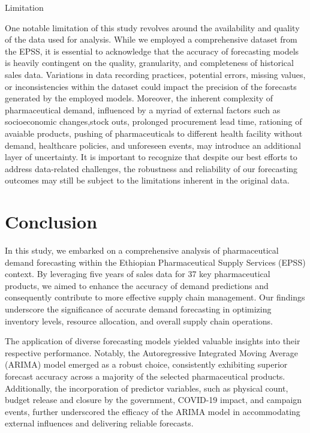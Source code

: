 \documentclass[
  authoryear,
  preprint,
  3p]{elsarticle}
\begin{document}
Limitation

One notable limitation of this study revolves around the availability
and quality of the data used for analysis. While we employed a
comprehensive dataset from the EPSS, it is essential to acknowledge that
the accuracy of forecasting models is heavily contingent on the quality,
granularity, and completeness of historical sales data. Variations in
data recording practices, potential errors, missing values, or
inconsistencies within the dataset could impact the precision of the
forecasts generated by the employed models. Moreover, the inherent
complexity of pharmaceutical demand, influenced by a myriad of external
factors such as socioeconomic changes,stock outs, prolonged procurement
lead time, rationing of avaiable products, pushing of pharmaceuticals to
different health facility without demand, healthcare policies, and
unforeseen events, may introduce an additional layer of uncertainty. It
is important to recognize that despite our best efforts to address
data-related challenges, the robustness and reliability of our
forecasting outcomes may still be subject to the limitations inherent in
the original data.

\hypertarget{sec-conclusion}{%
\section{Conclusion}\label{sec-conclusion}}

In this study, we embarked on a comprehensive analysis of pharmaceutical
demand forecasting within the Ethiopian Pharmaceutical Supply Services
(EPSS) context. By leveraging five years of sales data for 37 key
pharmaceutical products, we aimed to enhance the accuracy of demand
predictions and consequently contribute to more effective supply chain
management. Our findings underscore the significance of accurate demand
forecasting in optimizing inventory levels, resource allocation, and
overall supply chain operations.

The application of diverse forecasting models yielded valuable insights
into their respective performance. Notably, the Autoregressive
Integrated Moving Average (ARIMA) model emerged as a robust choice,
consistently exhibiting superior forecast accuracy across a majority of
the selected pharmaceutical products. Additionally, the incorporation of
predictor variables, such as physical count, budget release and closure
by the government, COVID-19 impact, and campaign events, further
underscored the efficacy of the ARIMA model in accommodating external
influences and delivering reliable forecasts.
\end{document}
